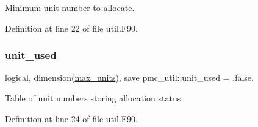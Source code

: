 Minimum unit number to allocate. 



Definition at line 22 of file util.\+F90.

\mbox{\label{namespacepmc__util_a172ec1eea3cead7645401a0b8c55fcb0}} 
\subsubsection{\texorpdfstring{unit\+\_\+used}{unit\_used}}
{\footnotesize\ttfamily logical, dimension(\mbox{\hyperlink{namespacepmc__util_a0bc01a46ad6e7b0d503c9181b1101ce0}{max\+\_\+units}}), save pmc\+\_\+util\+::unit\+\_\+used = .false.}



Table of unit numbers storing allocation status. 



Definition at line 24 of file util.\+F90.

